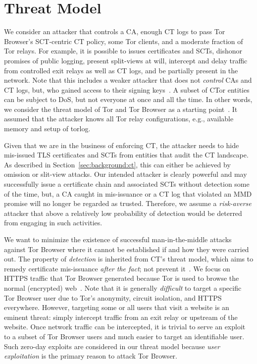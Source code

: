 \section{Threat Model} \label{sec:adversary}
%
%
We consider an attacker that controls
	a CA,
	enough CT logs to pass Tor Browser's SCT-centric CT policy, 
	some Tor clients, and
	a moderate fraction of Tor relays.
For example, it is possible to
	issues certificates and SCTs,
	dishonor promises of public logging,
	present split-views at will,
	intercept and delay traffic from controlled exit relays as well as CT logs,
		and
	be partially present in the network.
Note that this includes a weaker attacker that does not \emph{control} CAs and
CT logs, but, who gained access to their signing
keys~\cite{turktrust,gdca1-omission}.
A subset of CTor entities can be subject to DoS, but not everyone at once and
all the time.  In other words, we consider the threat model of Tor and Tor
Browser as a starting point~\cite{tor,tor-browser}.  It assumed that the
attacker knows all Tor relay configurations, e.g., available memory and setup of
torlog.

%
%
Given that we are in the business of enforcing CT, the attacker needs to hide
mis-issued TLS certificates and SCTs from entities that audit the CT landscape.
As described in Section~\ref{sec:background:ct}, this can either be achieved by
omission or slit-view attacks.  Our intended attacker is clearly powerful and may
successfully issue a certificate chain and associated SCTs without detection
some of the time, but, a CA caught in mis-issuance or a CT log that violated an
MMD promise will no longer be regarded as trusted.  Therefore, we assume a
\emph{risk-averse} attacker that above a relatively low probability of detection
would be deterred from engaging in such activities.

%
%
We want to minimize the existence of successful man-in-the-middle attacks
against Tor Browser where it cannot be established if
and how they were carried out.  The property of \emph{detection} is inherited
from CT's threat model, which aims to remedy certificate mis-issuance
\emph{after the fact}; not prevent it~\cite{ct/a}.  We
focus on HTTPS traffic that Tor Browser generated because Tor is used to browse
the normal (encrypted) web~\cite{mani}.  Note that it is generally
\emph{difficult} to target a specific Tor Browser user due to Tor's anonymity,
circuit isolation, and HTTPS everywhere.  However, targeting some or all 
users that visit a website is an eminent threat:
	simply intercept traffic from an exit relay or
	upstream of the website.
Once network traffic can be intercepted, it is trivial to serve an exploit to a
subset of Tor Browser users and much easier to target an identifiable user.
Such zero-day exploits are considered in our threat model because \emph{user
exploitation} is the primary reason to attack Tor Browser.

